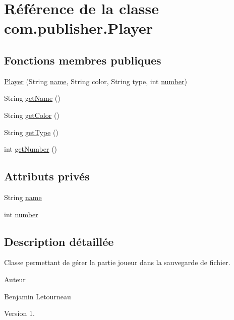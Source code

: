 \hypertarget{classcom_1_1publisher_1_1Player}{\section{Référence de la classe com.\-publisher.\-Player}
\label{classcom_1_1publisher_1_1Player}
}
\subsection*{Fonctions membres publiques}
\begin{DoxyCompactItemize}
\item 
\hyperlink{classcom_1_1publisher_1_1Player_ad51a50b89519bf8ba7aacbc1520f7ac3}{Player} (String \hyperlink{classcom_1_1publisher_1_1Player_a00b49fcbf9028825aa1b267ca81b306f}{name}, String color, String type, int \hyperlink{classcom_1_1publisher_1_1Player_a21983e0da7e0d78f48eea5c3841229b0}{number})
\item 
String \hyperlink{classcom_1_1publisher_1_1Player_a4b15b71498d4ab7e304b4b1544fbd80b}{get\-Name} ()
\item 
String \hyperlink{classcom_1_1publisher_1_1Player_ad9178d734466e9b4a3c40c5c61bca089}{get\-Color} ()
\item 
String \hyperlink{classcom_1_1publisher_1_1Player_af55a70ae53a1350b6a977b0da93edeb4}{get\-Type} ()
\item 
int \hyperlink{classcom_1_1publisher_1_1Player_a4334ac562ba11019526cafb7bdc2ffa3}{get\-Number} ()
\end{DoxyCompactItemize}
\subsection*{Attributs privés}
\begin{DoxyCompactItemize}
\item 
String \hyperlink{classcom_1_1publisher_1_1Player_a00b49fcbf9028825aa1b267ca81b306f}{name}
\item 
int \hyperlink{classcom_1_1publisher_1_1Player_a21983e0da7e0d78f48eea5c3841229b0}{number}
\end{DoxyCompactItemize}


\subsection{Description détaillée}
Classe permettant de gérer la partie joueur dans la sauvegarde de fichier. \begin{DoxyAuthor}{Auteur}

\begin{DoxyItemize}
\item Benjamin Letourneau 
\end{DoxyItemize}
\end{DoxyAuthor}
\begin{DoxyVersion}{Version}
1. 
\end{DoxyVersion}


